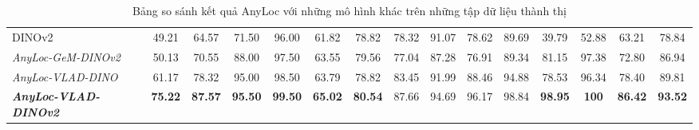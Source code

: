 \begin{table}[H]
{\begin{tabular}{lcccccccccccccc}
      DINOv2                                 & 49.21                                                           & 64.57                                                              & 71.50                                                          & 96.00                                                          & 61.82                                                         & 78.82                                                       & 78.32                                 & 91.07                    & 78.62                    & 89.69                    & 39.79                    & 52.88                    & 63.21                    & 78.84                    \\
      \rowcolor[HTML]{FFCE93}
      \textit{AnyLoc-GeM-DINOv2}             & 50.13                                                           & 70.55                                                              & 88.00                                                          & 97.50                                                          & 63.55                                                         & 79.56                                                       & 77.04                                 & 87.28                    & 76.91                    & 89.34                    & 81.15                    & 97.38                    & 72.80                    & 86.94                    \\
      \rowcolor[HTML]{FFCE93}
      \textit{AnyLoc-VLAD-DINO}              & 61.17                                                           & 78.32                                                              & 95.00                                                          & 98.50                                                          & 63.79                                                         & 78.82                                                       & 83.45                                 & 91.99                    & 88.46                    & 94.88                    & 78.53                    & 96.34                    & 78.40                    & 89.81                    \\
      \rowcolor[HTML]{FFCE93}
      \textit{\textbf{AnyLoc-VLAD-DINOv2}}   & \textbf{75.22}                                                  & \textbf{87.57}                                                     & \textbf{95.50}                                                 & \textbf{99.50}                                                 & \textbf{65.02}                                                & \textbf{80.54}                                              & 87.66                                 & 94.69                    & 96.17                    & 98.84                    & \textbf{98.95}           & \textbf{100}             & \textbf{86.42}           & \textbf{93.52}
    \end{tabular}}
  \caption{Bảng so sánh kết quả AnyLoc với những mô hình khác trên những tập dữ liệu thành thị}
\end{table}

